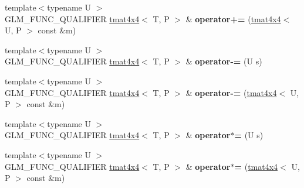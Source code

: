 \begin{DoxyCompactItemize}
\item 
{\footnotesize template$<$typename U $>$ }\\G\+L\+M\+\_\+\+F\+U\+N\+C\+\_\+\+Q\+U\+A\+L\+I\+F\+I\+ER \hyperlink{structglm_1_1detail_1_1tmat4x4}{tmat4x4}$<$ T, P $>$ \& {\bfseries operator+=} (\hyperlink{structglm_1_1detail_1_1tmat4x4}{tmat4x4}$<$ U, P $>$ const \&m)\hypertarget{structglm_1_1detail_1_1tmat4x4_a4b8bef58c04e28a9ba1d58375cc6f6b0}{}\label{structglm_1_1detail_1_1tmat4x4_a4b8bef58c04e28a9ba1d58375cc6f6b0}

\item 
{\footnotesize template$<$typename U $>$ }\\G\+L\+M\+\_\+\+F\+U\+N\+C\+\_\+\+Q\+U\+A\+L\+I\+F\+I\+ER \hyperlink{structglm_1_1detail_1_1tmat4x4}{tmat4x4}$<$ T, P $>$ \& {\bfseries operator-\/=} (U s)\hypertarget{structglm_1_1detail_1_1tmat4x4_ae950a3daa2e47531f7f3763192ebcf5b}{}\label{structglm_1_1detail_1_1tmat4x4_ae950a3daa2e47531f7f3763192ebcf5b}

\item 
{\footnotesize template$<$typename U $>$ }\\G\+L\+M\+\_\+\+F\+U\+N\+C\+\_\+\+Q\+U\+A\+L\+I\+F\+I\+ER \hyperlink{structglm_1_1detail_1_1tmat4x4}{tmat4x4}$<$ T, P $>$ \& {\bfseries operator-\/=} (\hyperlink{structglm_1_1detail_1_1tmat4x4}{tmat4x4}$<$ U, P $>$ const \&m)\hypertarget{structglm_1_1detail_1_1tmat4x4_aeba2224c00c02c2f7eca1b0675a85e70}{}\label{structglm_1_1detail_1_1tmat4x4_aeba2224c00c02c2f7eca1b0675a85e70}

\item 
{\footnotesize template$<$typename U $>$ }\\G\+L\+M\+\_\+\+F\+U\+N\+C\+\_\+\+Q\+U\+A\+L\+I\+F\+I\+ER \hyperlink{structglm_1_1detail_1_1tmat4x4}{tmat4x4}$<$ T, P $>$ \& {\bfseries operator$\ast$=} (U s)\hypertarget{structglm_1_1detail_1_1tmat4x4_af93523cd38761d56f5e3695085976f57}{}\label{structglm_1_1detail_1_1tmat4x4_af93523cd38761d56f5e3695085976f57}

\item 
{\footnotesize template$<$typename U $>$ }\\G\+L\+M\+\_\+\+F\+U\+N\+C\+\_\+\+Q\+U\+A\+L\+I\+F\+I\+ER \hyperlink{structglm_1_1detail_1_1tmat4x4}{tmat4x4}$<$ T, P $>$ \& {\bfseries operator$\ast$=} (\hyperlink{structglm_1_1detail_1_1tmat4x4}{tmat4x4}$<$ U, P $>$ const \&m)\hypertarget{structglm_1_1detail_1_1tmat4x4_a626eae06d9a644a9044db04a1138bbdd}{}\label{structglm_1_1detail_1_1tmat4x4_a626eae06d9a644a9044db04a1138bbdd}


\end{DoxyCompactItemize}
